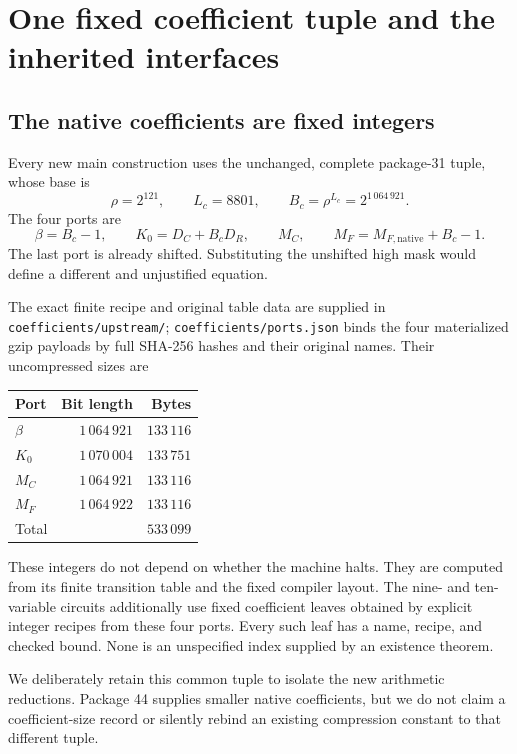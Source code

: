 \documentclass[11pt,a4paper]{article}
\theoremstyle{definition}
\theoremstyle{remark}
\numberwithin{equation}{section}
\begin{document}
\section{One fixed coefficient tuple and the inherited interfaces}
\label{sec:dependencies}

\subsection{The native coefficients are fixed integers}

Every new main construction uses the unchanged, complete package-31
tuple, whose base is
\[
 \rho=2^{121},\qquad L_c=8801,\qquad
 B_c=\rho^{L_c}=2^{1\,064\,921}.
\]
The four ports are
\[
 \beta=B_c-1,\qquad K_0=D_C+B_cD_R,\qquad M_C,
 \qquad M_F=M_{F,\mathrm{native}}+B_c-1.
\]
The last port is already shifted. Substituting the unshifted high mask
would define a different and unjustified equation.

The exact finite recipe and original table data are supplied in
\texttt{coefficients/upstream/}; \texttt{coefficients/ports.json}
binds the four materialized gzip payloads by full SHA-256 hashes and
their original names. Their uncompressed sizes are
\begin{center}
\begin{tabular}{@{}lrr@{}}
\toprule
Port & Bit length & Bytes\\
\midrule
$\beta$ & $1\,064\,921$ & $133\,116$\\
$K_0$ & $1\,070\,004$ & $133\,751$\\
$M_C$ & $1\,064\,921$ & $133\,116$\\
$M_F$ & $1\,064\,922$ & $133\,116$\\
\midrule
Total & & $533\,099$\\
\bottomrule
\end{tabular}
\end{center}
These integers do not depend on whether the machine halts. They are
computed from its finite transition table and the fixed compiler layout.
The nine- and ten-variable circuits additionally use fixed coefficient
leaves obtained by explicit integer recipes from these four ports.
Every such leaf has a name, recipe, and checked bound. None is an
unspecified index supplied by an existence theorem.

We deliberately retain this common tuple to isolate the new arithmetic
reductions. Package 44 supplies smaller native coefficients, but we do
not claim a coefficient-size record or silently rebind an existing
compression constant to that different tuple.
\end{document}
